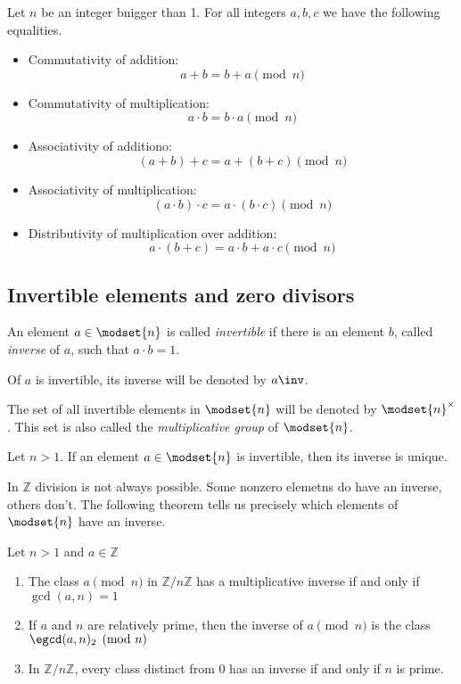 \begin{proposition}
    Let $n$ be an integer bnigger than 1. For all integers $a,b,c$ we have
    the following equalities.
    \begin{itemize}
        \item Commutativity of addition:
        $$ a + b = b + a \pmod{n} $$
        \item Commutativity of multiplication:
        $$ a \cdot b = b \cdot a \pmod{n} $$
        \item Associativity of additiono:
        $$ (a + b) + c = a + (b + c) \pmod{n} $$
        \item Associativity of multiplication:
        $$ (a \cdot b) \cdot c = a \cdot (b \cdot c) \pmod{n} $$
        \item Distributivity of multiplication over addition:
        $$ a \cdot (b + c) = a \cdot b + a \cdot c \pmod{n} $$
    \end{itemize}
\end{proposition}

\subsection{Invertible elements and zero divisors}
\begin{definition}
    An element $ a \in \modset{n} $ is called \emph{invertible} if there is
    an element $b$, called \emph{inverse} of $a$, such that $ a \cdot b = 1 $.

    Of $a$ is invertible, its inverse will be denoted by $ a\inv $.

    The set of all invertible elements in $\modset{n}$ will be denoted by
    $ \modset{n}^\times $. This set is also called the \emph{multiplicative
    group} of $ \modset{n} $.
\end{definition}

\begin{proposition}
    Let $ n > 1 $. If an element $a \in \modset{n}$ is invertible, then its
    inverse is unique.
\end{proposition}

In $ \mathbb{Z} $ division is not always possible. Some nonzero elemetns do
have an inverse, others don't. The following theorem tells us precisely
which elements of $ \modset{n} $ have an inverse.

\begin{theorem}
    Let $ n>1 $ and $ a \in \mathbb{Z} $
    \begin{enumerate}[label=(\alph*)]
        \item The class $a \pmod{n}$ in $ \mathbb{Z}/n\mathbb{Z} $ has a multiplicative inverse if and only if $ \gcd(a,n) = 1 $
        \item If $a$ and $n$ are relatively prime, then the inverse of $ a \pmod{n} $ is the class $ \egcd(a,n)_2 \pmod{n} $
        \item In $ \mathbb{Z}/n\mathbb{Z} $, every class distinct from 0 has an inverse if and only if $n$ is prime.
    \end{enumerate}
\end{theorem}

